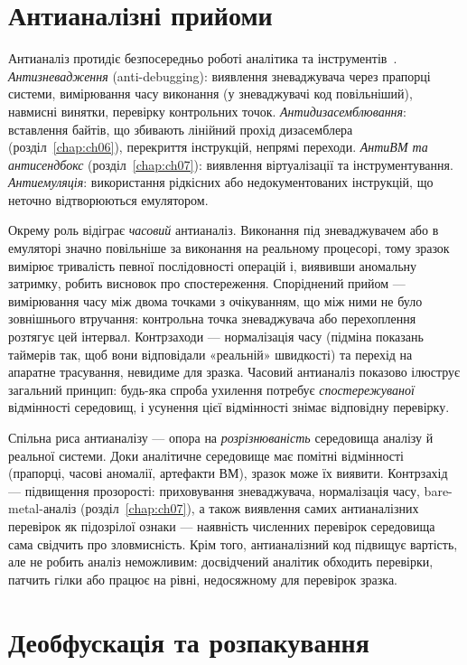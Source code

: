 \section{Антианалізні прийоми}\label{sec:ch08-antianalysis}

Антианаліз протидіє безпосередньо роботі аналітика та інструментів~\cite{ch08:branco}. \emph{Антизневадження} (anti-debugging): виявлення зневаджувача через прапорці системи, вимірювання часу виконання (у зневаджувачі код повільніший), навмисні винятки, перевірку контрольних точок. \emph{Антидизасемблювання}: вставлення байтів, що збивають лінійний прохід дизасемблера (розділ~\ref{chap:ch06}), перекриття інструкцій, непрямі переходи. \emph{АнтиВМ та антисендбокс} (розділ~\ref{chap:ch07}): виявлення віртуалізації та інструментування. \emph{Антиемуляція}: використання рідкісних або недокументованих інструкцій, що неточно відтворюються емулятором.

Окрему роль відіграє \emph{часовий} антианаліз. Виконання під зневаджувачем або в емуляторі значно повільніше за виконання на реальному процесорі, тому зразок вимірює тривалість певної послідовності операцій і, виявивши аномальну затримку, робить висновок про спостереження. Споріднений прийом --- вимірювання часу між двома точками з очікуванням, що між ними не було зовнішнього втручання: контрольна точка зневаджувача або перехоплення розтягує цей інтервал. Контрзаходи --- нормалізація часу (підміна показань таймерів так, щоб вони відповідали «реальній» швидкості) та перехід на апаратне трасування, невидиме для зразка. Часовий антианаліз показово ілюструє загальний принцип: будь-яка спроба ухилення потребує \emph{спостережуваної} відмінності середовищ, і усунення цієї відмінності знімає відповідну перевірку.

Спільна риса антианалізу --- опора на \emph{розрізнюваність} середовища аналізу й реальної системи. Доки аналітичне середовище має помітні відмінності (прапорці, часові аномалії, артефакти ВМ), зразок може їх виявити. Контрзахід --- підвищення прозорості: приховування зневаджувача, нормалізація часу, bare-metal-аналіз (розділ~\ref{chap:ch07}), а також виявлення самих антианалізних перевірок як підозрілої ознаки --- наявність численних перевірок середовища сама свідчить про зловмисність. Крім того, антианалізний код підвищує вартість, але не робить аналіз неможливим: досвідчений аналітик обходить перевірки, патчить гілки або працює на рівні, недосяжному для перевірок зразка.

\section{Деобфускація та розпакування}\label{sec:ch08-deobf}

